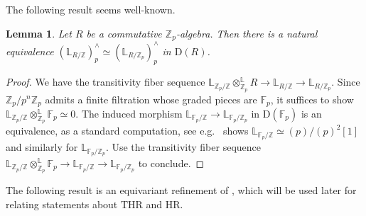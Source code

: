 \documentclass[10pt]{amsart}
\newtheorem{lem}[thm]{Lemma}
\theoremstyle{definition}
\numberwithin{equation}{section}
\newcommand{\F}{\mathbb{F}}
\renewcommand{\L}{\mathbb{L}}
\newcommand{\Z}{\mathbb{Z}}
\newcommand{\rD}{\mathrm{D}}
\newcommand{\HR}{\mathrm{HR}}
\newcommand{\THR}{\mathrm{THR}}
\begin{document}
The following result seems well-known.
\begin{lem}
\label{completed cotangent}
Let $R$ be a commutative $\Z_p$-algebra.
Then there is a natural equivalence $(\L_{R/\Z})_p^\wedge \simeq (\L_{R/\Z_p})_p^\wedge$ in $\rD(R)$.
\end{lem}
\begin{proof}
We have the transitivity fiber sequence
\(
\L_{\Z_p/\Z}\otimes_{\Z_p}^\L R
\to
\L_{R/\Z}
\to
\L_{R/\Z_p}.
\)
Since $\Z_p/p^n \Z_p$ admits a finite filtration whose graded pieces are $\F_p$, it suffices to show $\L_{\Z_p/\Z}\otimes_{\Z_p}^\L \F_p\simeq 0$. 
The induced morphism $\L_{\F_p/\Z}
\to
\L_{\F_p/\Z_p}$ in $\rD(\F_p)$
is an equivalence, as a standard computation, see e.g.\  \cite[\href{https://stacks.math.columbia.edu/tag/08SJ}{Tag 08SJ}]{stacks} shows  $\L_{\F_p/\Z}\simeq (p)/(p)^2[1]$ and  similarly for $\L_{\F_p/\Z_p}$.
Use the transitivity fiber sequence
\(
\L_{\Z_p/\Z}\otimes_{\Z_p}^\L \F_p
\to
\L_{\F_p/\Z}
\to
\L_{\F_p/\Z_p}
\)
to conclude.
\end{proof}




The following result is an equivariant refinement of \cite[a part of Lemma 2.5]{BMS19},
which will be used later for relating statements about $\THR$
and $\HR$.
\end{document}
